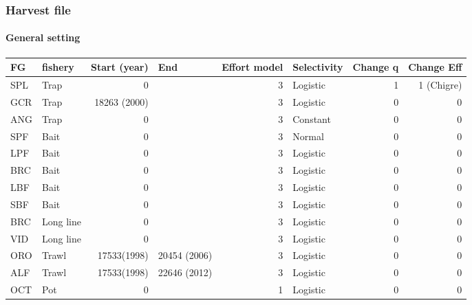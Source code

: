 \documentclass[11pt]{article}
\begin{document}
\subsubsection*{Harvest file}
\label{sec-5-2-2}
\paragraph*{General setting}
\label{sec-5-2-2-1}


\begin{center}
\begin{tabular}{llrlrlrr}
 FG   &  fishery    &  Start (year)  &  End           &  Effort model  &  Selectivity  &  Change q  &  Change Eff  \\
\hline
 SPL  &  Trap       &             0  &                &             3  &  Logistic     &         1  &  1 (Chigre)  \\
 GCR  &  Trap       &  18263 (2000)  &                &             3  &  Logistic     &         0  &           0  \\
 ANG  &  Trap       &             0  &                &             3  &  Constant     &         0  &           0  \\
 SPF  &  Bait       &             0  &                &             3  &  Normal       &         0  &           0  \\
 LPF  &  Bait       &             0  &                &             3  &  Logistic     &         0  &           0  \\
 BRC  &  Bait       &             0  &                &             3  &  Logistic     &         0  &           0  \\
 LBF  &  Bait       &             0  &                &             3  &  Logistic     &         0  &           0  \\
 SBF  &  Bait       &             0  &                &             3  &  Logistic     &         0  &           0  \\
 BRC  &  Long line  &             0  &                &             3  &  Logistic     &         0  &           0  \\
 VID  &  Long line  &             0  &                &             3  &  Logistic     &         0  &           0  \\
 ORO  &  Trawl      &   17533(1998)  &  20454 (2006)  &             3  &  Logistic     &         0  &           0  \\
 ALF  &  Trawl      &   17533(1998)  &  22646 (2012)  &             3  &  Logistic     &         0  &           0  \\
 OCT  &  Pot        &             0  &                &             1  &  Logistic     &         0  &           0  \\
\end{tabular}
\end{center}
\end{document}
